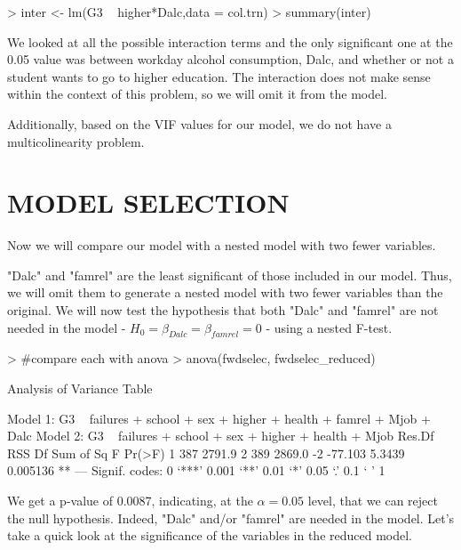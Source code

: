\documentclass{article}
\begin{document}
\begin{Schunk}
\begin{Sinput}
> inter <- lm(G3 ~ higher*Dalc,data = col.trn)
> summary(inter)
\end{Sinput}
\end{Schunk}

We looked at all the possible interaction terms and the only significant one at the 0.05 value was between workday alcohol consumption, Dalc, and whether or not a student wants to go to higher education. The interaction does not make sense within the context of this problem, so we will omit it from the model. 

Additionally, based on the VIF values for our model, we do not have a multicolinearity problem. 


\section{MODEL SELECTION}

Now we will compare our model with a nested model with two fewer variables.

"Dalc" and "famrel" are the least significant of those included in our model. Thus, we will omit them to generate a nested model with two fewer variables than the original. We will now test the hypothesis that both "Dalc" and "famrel" are not needed in the model - $H_{0}=\beta_{Dalc}=\beta_{famrel}=0$ - using a nested F-test. 

\begin{Schunk}
\begin{Sinput}
> #compare each with anova
> anova(fwdselec, fwdselec_reduced)
\end{Sinput}
\begin{Soutput}
Analysis of Variance Table

Model 1: G3 ~ failures + school + sex + higher + health + famrel + Mjob + 
    Dalc
Model 2: G3 ~ failures + school + sex + higher + health + Mjob
  Res.Df    RSS Df Sum of Sq      F   Pr(>F)   
1    387 2791.9                                
2    389 2869.0 -2   -77.103 5.3439 0.005136 **
---
Signif. codes:  0 ‘***’ 0.001 ‘**’ 0.01 ‘*’ 0.05 ‘.’ 0.1 ‘ ’ 1
\end{Soutput}
\end{Schunk}

We get a p-value of 0.0087, indicating, at the $\alpha=0.05$ level, that we can reject the null hypothesis. Indeed, "Dalc" and/or "famrel" are needed in the model. Let's take a quick look at the significance of the variables in the reduced model.
\end{document}
